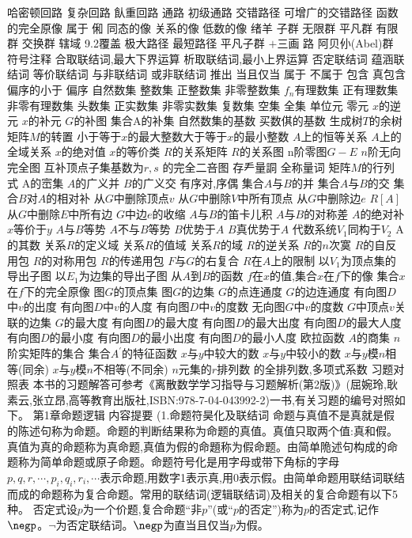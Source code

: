 哈密顿回路
复杂回路
飤重回路
通路
初级通路
交错路径
可增广的交错路径
函数的完全原像
属于
俰
同态的像
关系的像
低数的像
绪羊
子群
无限群
平凡群
有限群
交换群
辖域
9.2覆盖
极大路径
最短路径
平凡子群
$+$三画
路
阿贝仦(Abel)群
{符号注释}
合取联结词,最大下界运算
析取联结词,最小上界运算
否定联结词
蕴涵联结词
等价联结词
与非联结词
或非联结词
推出
当且仅当
属于
不属于
包含
真包含
偏序的小于
偏序
自然数集
整数集
正整数集
非零整数集
$f_{n}$有理数集
正有理数集
非零有理数集
头数集
正实数集
非零实数集
复数集
空集
全集
单位元
零元
$x$的逆元
$x$的补元
$G$的补图
集合A的补集
自然数集的基数
买数倛的基数
生成树$T$的余树矩阵$M$的转置
小于等于$x$的最大整数大于等于$x$的最小整数
$A$上的恒等关系
$A$上的全域关系
$x$的绝对值
$x$的等价类
$R$的关系矩阵
$R$的关系图
n阶零图$G-E$
$n$阶无向完全图
互补顶点子集基数为$r,s$
的完全二咅图
存龵量詷
全称量词
矩阵$M$的行列式
A的崈集
$A$的广义并
$B$的广义交
有序对,序偶
集合$A$与$B$的并
集合$A$与$B$的交
集合$B$对$A$的相对补
从$G$中删除顶点$v$
从$G$中删除$V$中所有顶点
从$G$中删除边$e$
$R[A]$从$G$中删除$E$中所有边
$G$中边$e$的收缩
$A$与$B$的笛卡儿积
$A$与$B$的对称差
$A$的绝对补
$x$等价于$y$
$A$与$B$等势
$A$不与$B$等势
$B$优势于$A$
$B$真优势于$A$
代数系统$V_{1}$同构于$V_{2}$
A的其数
关系$R$的定义域
关系$R$的值域
关系$R$的域
$R$的逆关系
$R$的$n$次寞
$R$的自反用包
$R$的对称用包
$R$的传递用包
$F$与$G$的右复合
$R$在$A$上的限制
以$V_{1}$为顶点集的导出子图
以$E_{1}$为边集的导出子图
从$A$到$B$的函数
$f$在$x$的值,集合$x$在$f$下的像
集合$x$在$f$下的完全原像
图$G$的顶点集
图$G$的边集
$G$的点连通度
$G$的边连通度
有向图$D$中$v$的出度
有向图$D$中$v$的人度
有向图$D$中$v$的度数
无向图$G$中$v$的度数
$G$中顶点$v$关联的边集
$G$的最大度
有向图$D$的最大度
有向图$D$的最大出度
有向图$D$的最大人度
有向图$D$的最小度
有向图$D$的最小出度
有向图$D$的最小人度
欧拉函数
$A$的商集
$n$阶实矩阵的集合
集合$A^{\prime}$的特征函数
$x$与$y$中较大的数
$x$与$y$中较小的数
$x$与$y$模$n$相等(同余)
$x$与$y$模$n$不相等(不同余)
$n$元集的$r$排列数
的全排列数,多项式系数
{习题对照表}
本书的习题解答可参考《离散数学学习指导与习题解析(第2版)》(屈婉玲,耿素云,张立昂,高等教育出版社,ISBN:978-7-04-043992-2)一书,有关习题的编号对照如下。
{第1章命题逻辑}
{内容提要}
{(1.命题符昊化及联结词}
命题与真值不是真就是假的陈述句称为命题。命题的判断结果称为命题的真值。真值只取两个值:真和假。真值为真的命题称为真命题,真值为假的命題称为假命题。由简单陒述句构成的命题称为简单命题或原子命题。命题符号化是用字母或带下角标的字母$p,q,r,\cdots,p_{i},q_{i},r_{i},\cdots$表示命题,用数字1表示真,用0表示假。由简单命题用联结词联结而成的命题称为复合命题。常用的联结词(逻辑联结词)及相关的复合命题有以下5种。
否定式设$p$为一个价题,复合命题“非$p$”(或“$p$的否定”)称为$p$的否定式,记作$\negp$。$\neg$为否定联结词。$\negp$为直当且仅当$p$为假。
